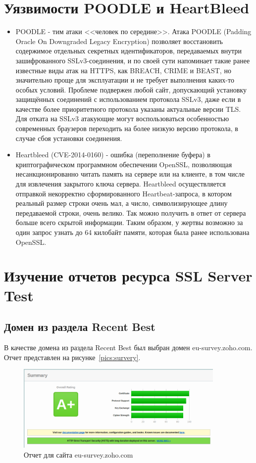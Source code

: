 \documentclass[10pt,a4paper]{report}
\begin{document}
	\section{Уязвимости POODLE и HeartBleed}
		\begin{itemize}
			\item POODLE - тим атаки <<человек по середине>>.
			Атака POODLE (Padding Oracle On Downgraded Legacy Encryption) позволяет восстановить содержимое отдельных секретных идентификаторов, передаваемых внутри зашифрованного SSLv3-соединения, и по своей сути напоминает такие ранее известные виды атак на HTTPS, как BREACH, CRIME и BEAST, но значительно проще для эксплуатации и не требует выполнения каких-то особых условий. Проблеме подвержен любой сайт, допускающий установку защищённых соединений с использованием протокола SSLv3, даже если в качестве более приоритетного протокола указаны актуальные версии TLS. Для отката на SSLv3 атакующие могут воспользоваться особенностью современных браузеров переходить на более низкую версию протокола, в случае сбоя установки соединения. 
			
			\item Heartbleed (CVE-2014-0160) - ошибка (переполнение буфера) в 
			криптографическом программном обеспечении OpenSSL, позволяющая 
			несанкционированно читать память на сервере или на клиенте, в том числе 
			для извлечения закрытого ключа сервера. 
			Heartbleed осуществляется отправкой некорректно сформированного 
			Heartbeat-запроса, в котором реальный размер строки очень мал, а число, 
			символизирующее длину передаваемой строки, очень велико.
			Так можно получить в ответ от сервера больше всего скрытой информации.
			Таким образом, у жертвы возможно за один запрос узнать до 64 килобайт 
			памяти, которая была ранее использована OpenSSL.
		\end{itemize}
	
	\section{Изучение отчетов ресурса SSL Server Test}
		\subsection{Домен из раздела Recent Best}
			В качестве домена из раздела Recent Best был выбран домен eu-survey.zoho.com.
			Отчет представлен на рисунке~\ref{pics:survery}.
			
			\begin{figure}[h]
				\centering
				\includegraphics[width=0.9\textwidth]{pics/survery.png}
				\caption{Отчет для сайта eu-survey.zoho.com}
				\label{ris:survery}
			\end{figure}
			
\end{document}
